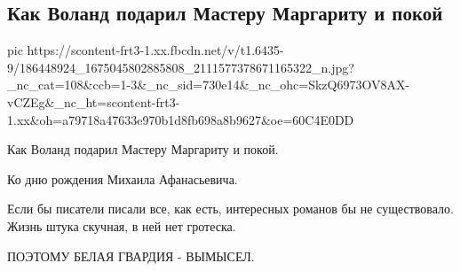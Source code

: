  
 
 
 
 

\subsection{Как Воланд подарил Мастеру Маргариту и покой}

\ifcmt
  pic https://scontent-frt3-1.xx.fbcdn.net/v/t1.6435-9/186448924_1675045802885808_2111577378671165322_n.jpg?_nc_cat=108&ccb=1-3&_nc_sid=730e14&_nc_ohc=SkzQ6973OV8AX-vCZEg&_nc_ht=scontent-frt3-1.xx&oh=a79718a47633e970b1d8fb698a8b9627&oe=60C4E0DD
\fi

Как Воланд подарил Мастеру Маргариту и покой.

Ко дню рождения Михаила Афанасьевича.

Если бы писатели писали все, как есть, интересных романов бы не существовало. Жизнь штука скучная, в ней нет гротеска. 

ПОЭТОМУ БЕЛАЯ ГВАРДИЯ - ВЫМЫСЕЛ.

